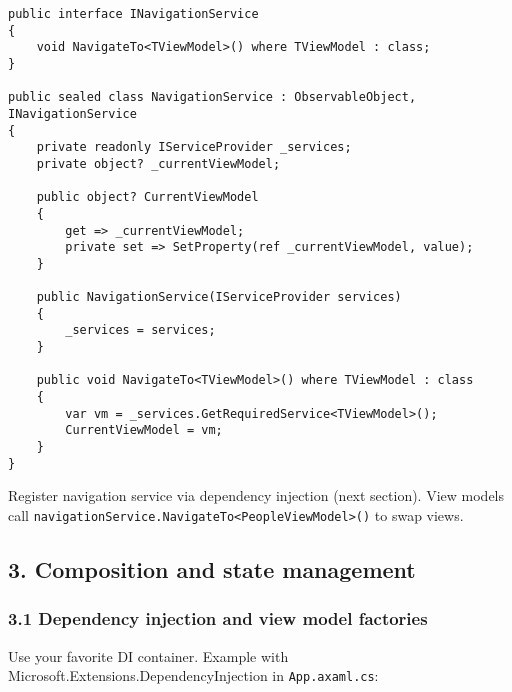 \begin{lstlisting}
public interface INavigationService
{
    void NavigateTo<TViewModel>() where TViewModel : class;
}

public sealed class NavigationService : ObservableObject, INavigationService
{
    private readonly IServiceProvider _services;
    private object? _currentViewModel;

    public object? CurrentViewModel
    {
        get => _currentViewModel;
        private set => SetProperty(ref _currentViewModel, value);
    }

    public NavigationService(IServiceProvider services)
    {
        _services = services;
    }

    public void NavigateTo<TViewModel>() where TViewModel : class
    {
        var vm = _services.GetRequiredService<TViewModel>();
        CurrentViewModel = vm;
    }
}
\end{lstlisting}

Register navigation service via dependency injection (next section).
View models call
\passthrough{\lstinline!navigationService.NavigateTo<PeopleViewModel>()!}
to swap views.

\subsection{3. Composition and state
management}\label{composition-and-state-management}

\subsubsection{3.1 Dependency injection and view model
factories}\label{dependency-injection-and-view-model-factories}

Use your favorite DI container. Example with
Microsoft.Extensions.DependencyInjection in
\passthrough{\lstinline!App.axaml.cs!}:

